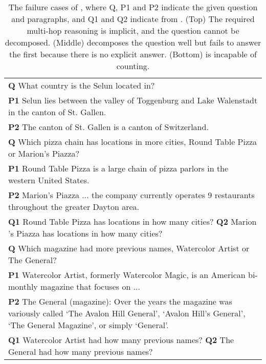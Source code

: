 \begin{table*}[t]
    \centering
    \small
    \begin{tabularx}{\textwidth}{X}
        \toprule
\textbf{Q} What country is the Selun located in? \\
        \textbf{P1} Selun lies between the valley of Toggenburg and Lake Walenstadt in the canton of St. Gallen. \\
        \textbf{P2} The canton of St. Gallen is a canton of {\color{red}Switzerland}. \\
        \midrule
        \textbf{Q} Which pizza chain has locations in more cities, Round Table Pizza or Marion's Piazza? \\
        \textbf{P1} {\color{red}Round Table Pizza} is a large chain of pizza parlors in the western United States. \\
        \textbf{P2} Marion's Piazza ... the company currently operates 9 restaurants throughout the greater Dayton area. \\
        \textbf{Q1} Round Table Pizza has locations in how many cities?
        \textbf{Q2} Marion 's Piazza has locations in how many cities? \\
        \midrule
        \textbf{Q} Which magazine had more previous names, Watercolor Artist or The General?\\
        \textbf{P1} Watercolor Artist, formerly Watercolor Magic, is an American bi-monthly magazine that focuses on ...  \\
        \textbf{P2} {\color{red}The General} (magazine): Over the years the magazine was variously called `The Avalon Hill General', `Avalon Hill's General', `The General Magazine', or simply `General'. \\
        \textbf{Q1} Watercolor Artist had how many previous names? \textbf{Q2} The General had how many previous names? \\
        \bottomrule              
    \end{tabularx}
    \caption{
    The failure cases of \sys, where {Q}, {P1} and {P2} indicate the given question and paragraphs, and {Q1} and {Q2} indicate \queries{} from \sys.
    (Top) The required multi-hop reasoning is implicit, and the question cannot be decomposed. (Middle) \sys{} decomposes the question well but fails to answer the first \query{} because there is no explicit answer. (Bottom) \sys{} is incapable of counting.
    }
    \label{tab:error}
\end{table*}
 
